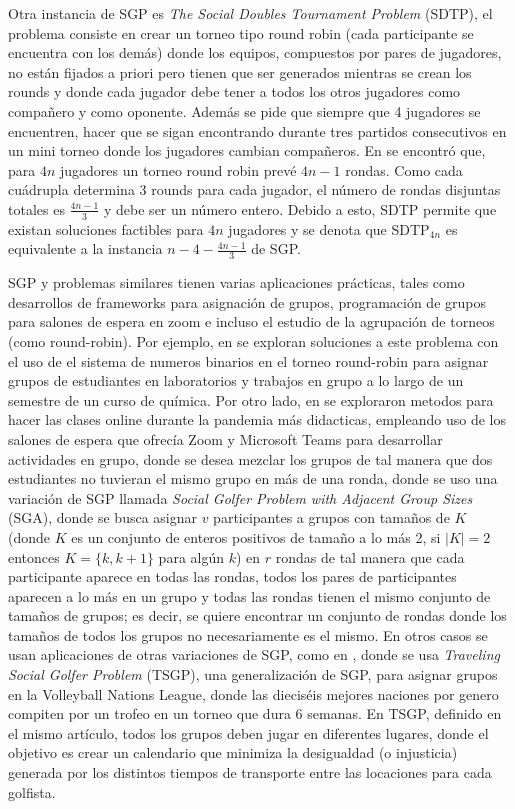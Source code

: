 \documentclass[letter, 10pt]{article}
\begin{document}
Otra instancia de SGP es \textit{The Social Doubles Tournament Problem} (SDTP), el problema consiste en crear un torneo tipo round robin (cada participante se encuentra con los demás) donde los equipos, compuestos por pares de jugadores, no están fijados a priori pero tienen que ser generados mientras se crean los rounds y donde cada jugador debe tener a todos los otros jugadores como compañero y como oponente. Además se pide que siempre que 4 jugadores se encuentren, hacer que se sigan encontrando durante tres partidos consecutivos en un mini torneo donde los jugadores cambian compañeros. En \cite{salassaa2017social} se encontró que, para $4n$ jugadores un torneo round robin prevé $4n-1$ rondas. Como cada cuádrupla determina 3 rounds para cada jugador, el número de rondas disjuntas totales es $\frac{4n-1}{3}$ y debe ser un número entero. Debido a esto, SDTP permite que existan soluciones factibles para $4n$ jugadores y se denota que SDTP$_{4n}$ es equivalente a la instancia $n-4-\frac{4n-1}{3}$ de SGP.   

SGP y problemas similares tienen varias aplicaciones prácticas, tales como desarrollos de frameworks para asignación de grupos, programación de grupos para salones de espera en zoom e incluso el estudio de la agrupación de torneos (como round-robin). Por ejemplo, en \cite{ACAD21SGP} se exploran soluciones a este problema con el uso de el sistema de numeros binarios en el torneo round-robin para asignar grupos de estudiantes en laboratorios y trabajos en grupo a lo largo de un semestre de un curso de química. Por otro lado, en \cite{MillerGroup21} se exploraron metodos para hacer las clases online durante la pandemia más didacticas, empleando uso de los salones de espera que ofrecía Zoom y Microsoft Teams para desarrollar actividades en grupo, donde se desea mezclar los grupos de tal manera que dos estudiantes no tuvieran el mismo grupo en más de una ronda, donde se uso una variación de SGP llamada \textit{Social Golfer Problem with Adjacent Group Sizes} (SGA), donde se busca asignar $v$ participantes a grupos con tamaños de $K$ (donde $K$ es un conjunto de enteros positivos de tamaño a lo más 2, si $|K|=2$ entonces $K=\{k,k+1\}$ para algún $k$) en $r$ rondas de tal manera que cada participante aparece en todas las rondas, todos los pares de participantes aparecen a lo más en un grupo y todas las rondas tienen el mismo conjunto de tamaños de grupos; es decir, se quiere encontrar un conjunto de rondas donde los tamaños de todos los grupos no necesariamente es el mismo. En otros casos se usan aplicaciones de otras variaciones de SGP, como en \cite{Lambers21Tournament}, donde se usa \textit{Traveling Social Golfer Problem} (TSGP), una generalización de SGP, para asignar grupos en la Volleyball Nations League, donde las dieciséis mejores naciones por genero compiten por un trofeo en un torneo que dura 6 semanas. En TSGP, definido en el mismo artículo, todos los grupos deben jugar en diferentes lugares, donde el objetivo es crear un calendario que minimiza la desigualdad (o injusticia) generada por los distintos tiempos de transporte entre las locaciones para cada golfista.
\end{document}
